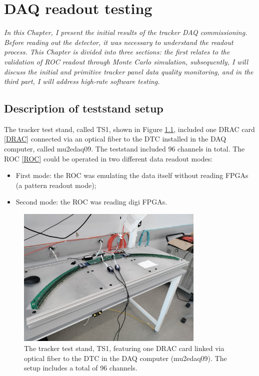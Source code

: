 \chapter{DAQ readout testing}
\textit{In this Chapter, I present the initial results of the tracker DAQ commissioning. Before reading out the detector, 
    it was necessary to understand the readout process. This Chapter is divided into three sections: the first relates 
    to the validation of ROC readout through Monte Carlo simulation, subsequently, I will discuss the initial and primitive tracker panel data quality monitoring, 
    and in the third part, I will address high-rate software testing.}
  \section{Description of teststand setup}
    The tracker test stand,  called TS1, shown in Figure \ref{fig:TS1}, included one DRAC card \ref{DRAC} connected via an optical fiber
    to the DTC installed in the DAQ computer, called mu2edaq09. The teststand included 96 channels in total.
    The ROC \ref{ROC} could be operated in two different data readout modes:
    \begin{itemize}
    \item  First mode: the ROC was emulating the data itself without reading FPGAs (a pattern readout mode);
    \item  Second mode: the ROC was reading digi FPGAs.
    \end{itemize}
    \begin{figure}[!h]
        \centering
        \includegraphics[width =0.8\textwidth]{figures/jpg/IMG_20240219_090538.jpg}
        \caption{The tracker test stand, TS1, featuring one DRAC card linked via optical fiber to the DTC in the DAQ computer (mu2edaq09). The setup includes a total of 96 channels.}
        \label{fig:TS1}
        \end{figure}

